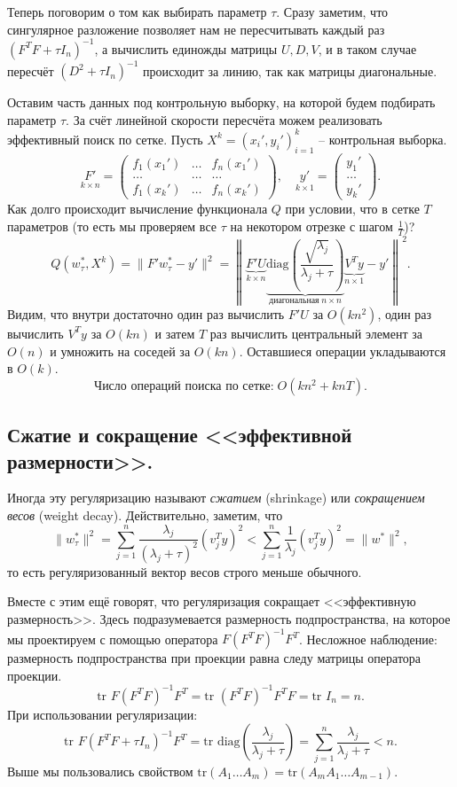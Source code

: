 Теперь поговорим о том как выбирать параметр $\tau$. Сразу заметим, что сингулярное разложение позволяет нам не пересчитывать каждый раз $(F^TF + \tau I_n)^{-1}$, а вычислить единожды матрицы $U, D, V$, и в таком случае пересчёт $(D^2 + \tau I_n)^{-1}$ происходит за линию, так как матрицы диагональные.

Оставим часть данных под контрольную выборку, на которой будем подбирать параметр $\tau$. За счёт линейной скорости пересчёта можем реализовать эффективный поиск по сетке. Пусть $X^k = (x_i', y_i')_{i=1}^k$ -- контрольная выборка.
$$\underset{k \times n}{F'} = \begin{pmatrix}
    f_1(x_1') & \dots & f_n(x_1') \\
    \dots & \dots & \dots \\
    f_1(x_k') & \dots & f_n(x_k')
\end{pmatrix}, \quad \underset{k \times 1}{y'} = \begin{pmatrix}
    y_1' \\
    \dots \\
    y_k'
\end{pmatrix}.$$
Как долго происходит вычисление функционала $Q$ при условии, что в сетке $T$ параметров (то есть мы проверяем все $\tau$ на некотором отрезке с шагом $\frac{1}{T}$)?
$$Q(w_\tau^*, X^k) = \|F'w_\tau^* - y'\|^2 = \left\|\underset{k \times n}{\underbrace{F'U}} \underset{\text{диагональная} \; n \times n}{\underbrace{\text{diag}\left(\frac{\sqrt{\lambda_j}}{\lambda_j + \tau}\right)}}\underset{n \times 1}{\underbrace{V^Ty}} - y'\right\|^2.$$
Видим, что внутри достаточно один раз вычислить $F'U$ за $O(kn^2)$, один раз вычислить $V^Ty$ за $O(kn)$ и затем $T$ раз вычислить центральный элемент за $O(n)$ и умножить на соседей за $O(kn)$. Оставшиеся операции укладываются в $O(k)$.
$$\text{Число операций поиска по сетке:} \; O(kn^2 + knT).$$

\subsection*{Сжатие и сокращение <<эффективной размерности>>.}
Иногда эту регуляризацию называют \textit{сжатием} (shrinkage) или \textit{сокращением весов} (weight decay). Действительно, заметим, что
$$\|w_\tau^*\|^2 = \sum_{j=1}^n \frac{\lambda_j}{(\lambda_j + \tau)^2}(v_j^Ty)^2 < \sum_{j=1}^n \frac{1}{\lambda_j} (v_j^Ty)^2 = \|w^*\|^2,$$
то есть регуляризованный вектор весов строго меньше обычного.

Вместе с этим ещё говорят, что регуляризация сокращает <<эффективную размерность>>. Здесь подразумевается размерность подпространства, на которое мы проектируем с помощью оператора $F(F^TF)^{-1}F^T$. Несложное наблюдение: размерность подпространства при проекции равна следу матрицы оператора проекции.
$$\text{tr } F(F^TF)^{-1}F^T = \text{tr } (F^T F)^{-1} F^TF = \text{tr } I_n = n.$$
При использовании регуляризации:
$$\text{tr } F(F^TF + \tau I_n)^{-1}F^T = \text{tr } \text{diag}\left(\frac{\lambda_j}{\lambda_j + \tau}\right) = \sum_{j=1}^n \frac{\lambda_j}{\lambda_j + \tau} < n.$$
Выше мы пользовались свойством $\text{tr}(A_1 \dots A_m) = \text{tr}(A_m A_1 \dots A_{m-1})$.

